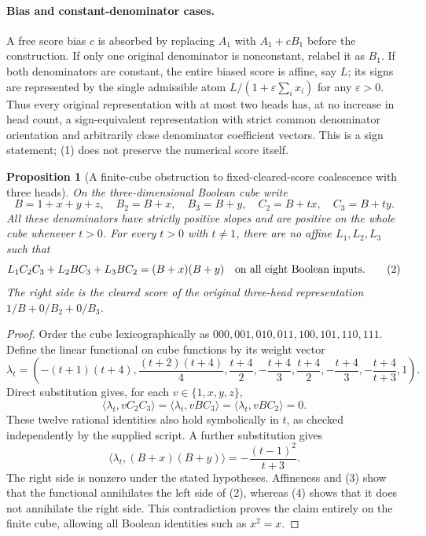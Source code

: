 \documentclass[11pt]{article}
\newtheorem{proposition}[theorem]{Proposition}
\begin{document}
\paragraph{Bias and constant-denominator cases.}
A free score bias $c$ is absorbed by replacing $A_1$ with $A_1+cB_1$
before the construction. If only one original denominator is
nonconstant, relabel it as $B_1$. If both denominators are constant,
the entire biased score is affine, say $L$; its signs are represented
by the single admissible atom
$L/(1+\varepsilon\sum_i x_i)$ for any $\varepsilon>0$.
Thus every original representation with at most two heads has, at no
increase in head count, a sign-equivalent representation with strict
common denominator orientation and arbitrarily close denominator
coefficient vectors. This is a sign statement; (1) does not preserve
the numerical score itself.

\begin{proposition}[A finite-cube obstruction to fixed-cleared-score
coalescence with three heads]\label{prop:three}
On the three-dimensional Boolean cube write
\[
 B=1+x+y+z,\quad B_2=B+x,\quad B_3=B+y,
 \quad C_2=B+tx,\quad C_3=B+ty.
\]
All these denominators have strictly positive slopes and are positive
on the whole cube whenever $t>0$. For every $t>0$ with $t\neq1$,
there are no affine $L_1,L_2,L_3$ such that
\[
 L_1C_2C_3+L_2BC_3+L_3BC_2=(B+x)(B+y)
 \quad\hbox{on all eight Boolean inputs}.                 \tag{2}
\]
The right side is the cleared score of the original three-head
representation $1/B+0/B_2+0/B_3$.
\end{proposition}

\begin{proof}
Order the cube lexicographically as $000,001,010,011,100,101,110,111$.
Define the linear functional on cube functions by its weight vector
\[
 \lambda_t=\left(
 -(t+1)(t+4),\frac{(t+2)(t+4)}4,
 \frac{t+4}2,-\frac{t+4}3,
 \frac{t+4}2,-\frac{t+4}3,
 -\frac{t+4}{t+3},1\right).
\]
Direct substitution gives, for each $v\in\{1,x,y,z\}$,
\[
 \langle\lambda_t,vC_2C_3\rangle
 =\langle\lambda_t,vBC_3\rangle
 =\langle\lambda_t,vBC_2\rangle=0.                     \tag{3}
\]
These twelve rational identities also hold symbolically in $t$, as
checked independently by the supplied script. A further substitution
gives
\[
 \langle\lambda_t,(B+x)(B+y)\rangle
 =-\frac{(t-1)^2}{t+3}.                               \tag{4}
\]
The right side is nonzero under the stated hypotheses. Affineness and
(3) show that the functional annihilates the left side of (2), whereas
(4) shows that it does not annihilate the right side. This contradiction
proves the claim entirely on the finite cube, allowing all Boolean
identities such as $x^2=x$.
\end{proof}
\end{document}

